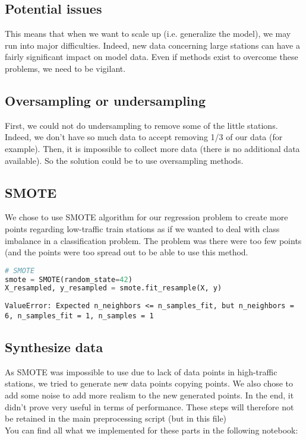 \subsection{Potential issues}
This means that when we want to scale up (i.e. generalize the model), we may run into major difficulties. Indeed, new data concerning large stations can have a fairly significant impact on model data. Even if methods exist to overcome these problems, we need to be vigilant.

\subsection{Oversampling or undersampling}
First, we could not do undersampling to remove some of the little stations. Indeed, we don't have so much data to accept removing 1/3 of our data (for example). Then, it is impossible to collect more data (there is no additional data available). So the solution could be to use oversampling methods.
\subsection{SMOTE}
We chose to use SMOTE algorithm for our regression problem to create more points regarding low-traffic train stations as if we wanted to deal with class imbalance in a classification problem. The problem was there were too few points (and the points were too spread out to be able to use this method.
\begin{lstlisting}[language=Python]
# SMOTE
smote = SMOTE(random_state=42)
X_resampled, y_resampled = smote.fit_resample(X, y)
\end{lstlisting}
\begin{lstlisting}
ValueError: Expected n_neighbors <= n_samples_fit, but n_neighbors = 6, n_samples_fit = 1, n_samples = 1
\end{lstlisting}

\subsection{Synthesize data}
As SMOTE was impossible to use due to lack of data points in high-traffic stations, we tried to generate new data points copying points. We also chose to add some noise to add more realism to the new generated points. In the end, it didn't prove very useful in terms of performance. These steps will therefore not be retained in the main preprocessing script (but in this file)\\

You can find all what we implemented for these parts in the following notebook:\\
\href{https://github.com/pierre-jezegou/fib-ml-project/blob/main/models/sampling.ipynb}{}


